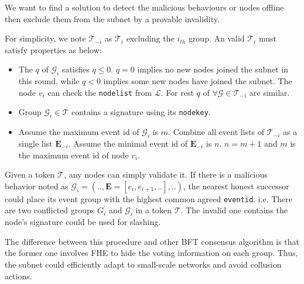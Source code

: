 \documentclass[11pt]{article}
\begin{document}
We want to find a solution to detect the malicious behaviours or nodes offline then exclude them from the subnet by a provable invalidity.

For simplicity, we note $\mathcal{T}_{-i}$ as $\mathcal{T}_{i}$ excluding the $i_{th}$ group. An valid $\mathcal{T}_{i}$ must satisfy properties as below:

\begin{itemize}
\item The $q$ of $\mathcal{G}_{i}$ satisfies \(q \leq 0\). $q=0$ implies no new nodes joined the subnet in this round, while $q < 0$ implies some new nodes have joined the subnet. The node $v_{i}$ can check the \texttt{nodelist} from $\mathcal{L}$.
For rest $q$ of $\forall \mathcal{G} \in \mathcal{T}_{-i}$ are similar.
\item Group $\mathcal{G}_{i} \in \mathcal{T}$ contains a signature using its \texttt{nodekey}.
\item Assume the maximum event id of $\mathcal{G}_{i}$ is $m$. Combine all event lists of $\mathcal{T}_{-i}$ as a single list $\mathbf{E}_{-i}$. Assume the minimal event id of $\mathbf{E}_{-i}$ is $n$.
\(n = m+1\) and $m$ is the maximum event id of node $v_{i}$.
\end{itemize}

Given a token $\mathcal{T}$, any nodes can simply validate it.
If there is a malicious behavior noted as \( \mathcal{G}_{i} = (.., \mathbf{E} = [e_{i}, e_{i+1}, ..], ..) \), the nearest honest successor could place its event group with the highest common agreed \texttt{eventid}.
i.e. There are two conflicted groups $G_{i}^{\prime}$ and $\mathcal{G}_{i}$ in a token $\mathcal{T}$. The invalid one contains the node's signature could be used for slashing.


The difference between this procedure and other BFT consensus algorithm is that the former one involves FHE to hide the voting information on each group.
Thus, the subnet could efficiently adapt to small-scale networks and avoid collusion actions.


\end{document}
